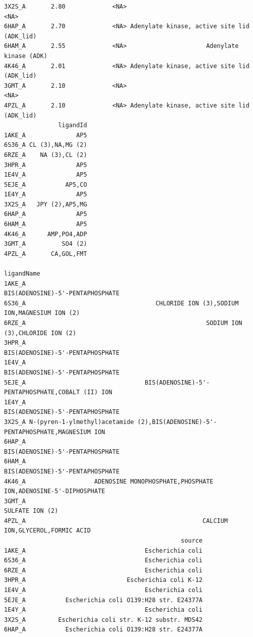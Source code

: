 \documentclass[
  letterpaper,
  DIV=11,
  numbers=noendperiod]{scrartcl}
\begin{document}
\begin{verbatim}
3X2S_A       2.80             <NA>                                        <NA>
6HAP_A       2.70             <NA> Adenylate kinase, active site lid (ADK_lid)
6HAM_A       2.55             <NA>                      Adenylate kinase (ADK)
4K46_A       2.01             <NA> Adenylate kinase, active site lid (ADK_lid)
3GMT_A       2.10             <NA>                                        <NA>
4PZL_A       2.10             <NA> Adenylate kinase, active site lid (ADK_lid)
               ligandId
1AKE_A              AP5
6S36_A CL (3),NA,MG (2)
6RZE_A    NA (3),CL (2)
3HPR_A              AP5
1E4V_A              AP5
5EJE_A           AP5,CO
1E4Y_A              AP5
3X2S_A   JPY (2),AP5,MG
6HAP_A              AP5
6HAM_A              AP5
4K46_A      AMP,PO4,ADP
3GMT_A          SO4 (2)
4PZL_A       CA,GOL,FMT
                                                                             ligandName
1AKE_A                                                 BIS(ADENOSINE)-5'-PENTAPHOSPHATE
6S36_A                                    CHLORIDE ION (3),SODIUM ION,MAGNESIUM ION (2)
6RZE_A                                                  SODIUM ION (3),CHLORIDE ION (2)
3HPR_A                                                 BIS(ADENOSINE)-5'-PENTAPHOSPHATE
1E4V_A                                                 BIS(ADENOSINE)-5'-PENTAPHOSPHATE
5EJE_A                                 BIS(ADENOSINE)-5'-PENTAPHOSPHATE,COBALT (II) ION
1E4Y_A                                                 BIS(ADENOSINE)-5'-PENTAPHOSPHATE
3X2S_A N-(pyren-1-ylmethyl)acetamide (2),BIS(ADENOSINE)-5'-PENTAPHOSPHATE,MAGNESIUM ION
6HAP_A                                                 BIS(ADENOSINE)-5'-PENTAPHOSPHATE
6HAM_A                                                 BIS(ADENOSINE)-5'-PENTAPHOSPHATE
4K46_A                   ADENOSINE MONOPHOSPHATE,PHOSPHATE ION,ADENOSINE-5'-DIPHOSPHATE
3GMT_A                                                                  SULFATE ION (2)
4PZL_A                                                 CALCIUM ION,GLYCEROL,FORMIC ACID
                                                 source
1AKE_A                                 Escherichia coli
6S36_A                                 Escherichia coli
6RZE_A                                 Escherichia coli
3HPR_A                            Escherichia coli K-12
1E4V_A                                 Escherichia coli
5EJE_A           Escherichia coli O139:H28 str. E24377A
1E4Y_A                                 Escherichia coli
3X2S_A         Escherichia coli str. K-12 substr. MDS42
6HAP_A           Escherichia coli O139:H28 str. E24377A

\end{verbatim}
\end{document}
